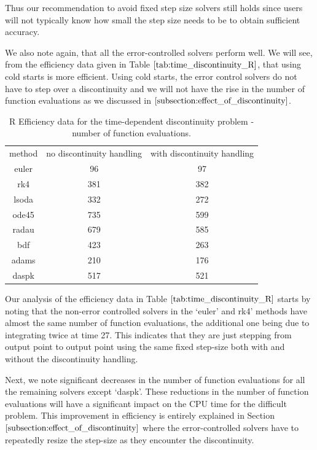 Thus our recommendation to avoid fixed step size solvers still holds since users will not typically know how small the step size needs to be to obtain sufficient accuracy.

We also note again, that all the error-controlled solvers perform well. We will see, from the efficiency data given in Table $\ref{tab:time_discontinuity_R}$, that using cold starts is more efficient. Using cold starts, the error control solvers do not have to step over a discontinuity and we will not have the rise in the number of function evaluations as we discussed in $\ref{subsection:effect_of_discontinuity}$. 

\begin{table}[H]
\caption {R Efficiency data for the time-dependent discontinuity problem - number of function evaluations.} 
\label{tab:time_discontinuity_R}
\begin{center}
\begin{tabular}{ c c c } 
method & no discontinuity handling & with discontinuity handling \\ 
euler & 96 & 97 \\
rk4 & 381 & 382 \\ 
lsoda & 332 & 272 \\
ode45 & 735 & 599 \\
radau & 679 & 585 \\
bdf & 423 & 263 \\
adams & 210 & 176 \\
daspk & 517 & 521
\end{tabular}
\end{center}
\end{table}

Our analysis of the efficiency data in Table $\ref{tab:time_discontinuity_R}$ starts by noting that the non-error controlled solvers in the `euler' and rk4' methods have almost the same number of function evaluations, the additional one being due to integrating twice at time 27. This indicates that they are just stepping from output point to output point using the same fixed step-size both with and without the discontinuity handling.

Next, we note significant decreases in the number of function evaluations for all the remaining solvers except `daspk'. These reductions in the number of function evaluations will have a significant impact on the CPU time for the difficult problem. This improvement in efficiency is entirely explained in Section $\ref{subsection:effect_of_discontinuity}$ where the error-controlled solvers have to repeatedly resize the step-size as they encounter the discontinuity.

